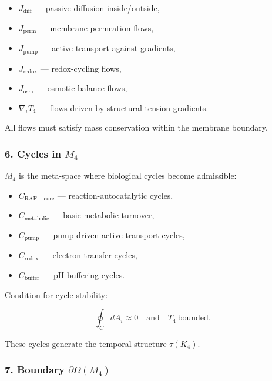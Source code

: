 \begin{itemize}
    \item $J_{\mathrm{diff}}$ — passive diffusion inside/outside,
    \item $J_{\mathrm{perm}}$ — membrane-permeation flows,
    \item $J_{\mathrm{pump}}$ — active transport against gradients,
    \item $J_{\mathrm{redox}}$ — redox-cycling flows,
    \item $J_{\mathrm{osm}}$ — osmotic balance flows,
    \item $\nabla_i T_4$ — flows driven by structural tension gradients.
\end{itemize}

All flows must satisfy mass conservation within the membrane boundary.

\subsubsection*{6. Cycles in \texorpdfstring{$M_4$}{M_4}}

$M_4$ is the meta-space where biological cycles become admissible:

\begin{itemize}
    \item $C_{\mathrm{RAF-core}}$ — reaction-autocatalytic cycles,
    \item $C_{\mathrm{metabolic}}$ — basic metabolic turnover,
    \item $C_{\mathrm{pump}}$ — pump-driven active transport cycles,
    \item $C_{\mathrm{redox}}$ — electron-transfer cycles,
    \item $C_{\mathrm{buffer}}$ — pH-buffering cycles.
\end{itemize}

Condition for cycle stability:

\[
\oint_C dA_i \approx 0
\quad\text{and}\quad 
T_4 \ \text{bounded}.
\]

These cycles generate the temporal structure $\tau(K_4)$.

\subsubsection*{7. Boundary \texorpdfstring{$\partial\Omega(M_4)$}{\partial\Omega(M_4)}}

